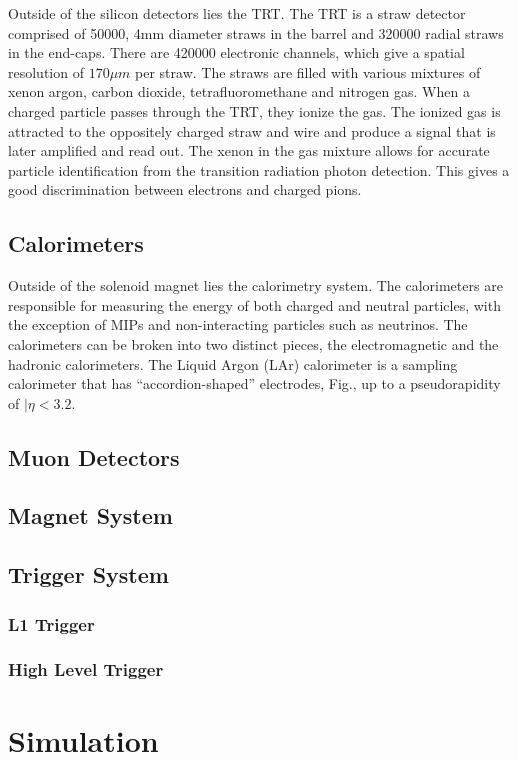 \indent Outside of the silicon detectors lies the TRT. The TRT is a straw detector comprised of 50000, 4mm diameter straws in the barrel and 320000 radial straws in the end-caps. There are 420000 electronic channels, which give a spatial resolution of ${170\mu{m}}$ per straw. The straws are filled with various mixtures of xenon argon, carbon dioxide, tetrafluoromethane and nitrogen gas. When a charged particle passes through the TRT, they ionize the gas. The ionized gas is attracted to the oppositely charged straw and wire and produce a signal that is later amplified and read out. The xenon in the gas mixture allows for accurate particle identification from the transition radiation photon detection.  This gives a good discrimination between electrons and charged pions.

\subsection{Calorimeters}\label{ssec:calo}
Outside of the solenoid magnet lies the calorimetry system. The calorimeters are responsible for measuring the energy of both charged and neutral particles, with the exception of MIPs and non-interacting particles such as neutrinos. The calorimeters can be broken into two distinct pieces, the electromagnetic and the hadronic calorimeters. \linebreak
\indent The Liquid Argon (LAr) calorimeter is a sampling calorimeter that has “accordion-shaped” electrodes, Fig., up to a pseudorapidity of ${|\eta<3.2}$. 
\subsection{Muon Detectors}
\subsection{Magnet System}\label{ssec:mag}
\subsection{Trigger System}
\subsubsection{L1 Trigger}
\subsubsection{High Level Trigger}
\section{Simulation}




